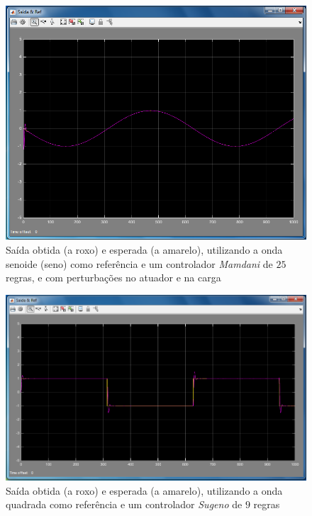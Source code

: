 \documentclass{article}
\begin{document}
\begin{figure}[h]
  \centering
      \includegraphics[scale=0.3]{Images/Mamdani_25_sin_actuator_charge.png}
  \caption{Saída obtida (a roxo) e esperada (a amarelo), utilizando a onda senoide (seno) como referência e um controlador \emph{Mamdani} de $25$ regras, e com perturbações no atuador e na carga}
\end{figure}

\clearpage


\begin{figure}[h]
  \centering
      \includegraphics[scale=0.3]{Images/Sugeno_9_square.png}
  \caption{Saída obtida (a roxo) e esperada (a amarelo), utilizando a onda quadrada como referência e um controlador \emph{Sugeno} de $9$ regras}
\end{figure}
\end{document}
